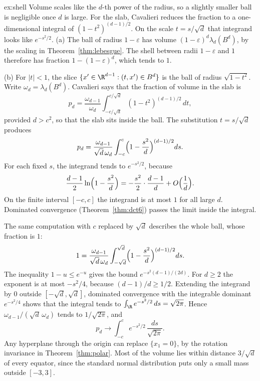 \begin{solution}{ex:shell}
\idea Volume scales like the $d$-th power of the radius, so a slightly smaller ball is negligible once $d$ is large. For the slab, Cavalieri reduces the fraction to a one-dimensional integral of $(1-t^2)^{(d-1)/2}$. On the scale $t=s/\sqrt d$ that integrand looks like $e^{-s^2/2}$.
\writeup (a) The ball of radius $1-\varepsilon$ has volume $(1-\varepsilon)^d\lambda_d(B^d)$, by the scaling in Theorem~\ref{thm:lebesgue}. The shell between radii $1-\varepsilon$ and $1$ therefore has fraction $1-(1-\varepsilon)^d$, which tends to $1$.

(b) For $|t|<1$, the slice $\{x'\in\R^{d-1}:(t,x')\in B^d\}$ is the ball of radius $\sqrt{1-t^2}$. Write $\omega_d=\lambda_d(B^d)$. Cavalieri says that the fraction of volume in the slab is
\[
p_d=\frac{\omega_{d-1}}{\omega_d}\int_{-c/\sqrt d}^{c/\sqrt d}(1-t^2)^{(d-1)/2}\,dt,
\]
provided $d>c^2$, so that the slab sits inside the ball. The substitution $t=s/\sqrt d$ produces
\[
p_d=\frac{\omega_{d-1}}{\sqrt d\,\omega_d}\int_{-c}^c\Bigl(1-\frac{s^2}d\Bigr)^{(d-1)/2}ds.
\]
For each fixed $s$, the integrand tends to $e^{-s^2/2}$, because
\[
\frac{d-1}2\ln\Bigl(1-\frac{s^2}d\Bigr)=-\frac{s^2}2\cdot\frac{d-1}d+O\Bigl(\frac1d\Bigr).
\]
On the finite interval $[-c,c]$ the integrand is at most $1$ for all large $d$. Dominated convergence (Theorem~\ref{thm:dct6}) passes the limit inside the integral.

The same computation with $c$ replaced by $\sqrt d$ describes the whole ball, whose fraction is $1$:
\[
1=\frac{\omega_{d-1}}{\sqrt d\,\omega_d}\int_{-\sqrt d}^{\sqrt d}\Bigl(1-\frac{s^2}d\Bigr)^{(d-1)/2}ds.
\]
The inequality $1-u\le e^{-u}$ gives the bound $e^{-s^2(d-1)/(2d)}$. For $d\ge 2$ the exponent is at most $-s^2/4$, because $(d-1)/d\ge 1/2$. Extending the integrand by $0$ outside $[-\sqrt d,\sqrt d]$, dominated convergence with the integrable dominant $e^{-s^2/4}$ shows that the integral tends to $\int_\R e^{-s^2/2}\,ds=\sqrt{2\pi}$. Hence $\omega_{d-1}/(\sqrt d\,\omega_d)$ tends to $1/\sqrt{2\pi}$, and
\[
p_d\to\int_{-c}^c e^{-s^2/2}\,\frac{ds}{\sqrt{2\pi}}.
\]
Any hyperplane through the origin can replace $\{x_1=0\}$, by the rotation invariance in Theorem~\ref{thm:polar}. Most of the volume lies within distance $3/\sqrt d$ of every equator, since the standard normal distribution puts only a small mass outside $[-3,3]$.
\end{solution}

